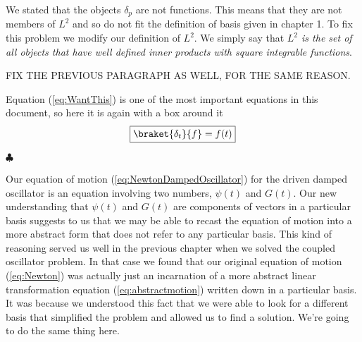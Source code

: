 We stated that the objects $\delta_{p}$ are not functions.  This means that they are not members of $L^2$ and so do not fit the definition of basis given in chapter 1.  To fix this problem we modify our definition of $L^2$.  We simply say that \emph{$L^2$ is the set of all objects that have well defined inner products with square integrable functions}.

FIX THE PREVIOUS PARAGRAPH AS WELL, FOR THE SAME REASON.

Equation (\ref{eq:WantThis}) is one of the most important equations in this document, so here it is again with a box around it
\begin{displaymath} \framebox{$\braket{\delta_t}{f}=f(t)$} \end{displaymath}

\begin{flushleft} $\clubsuit$ \end{flushleft}
Our equation of motion (\ref{eq:NewtonDampedOscillator}) for the driven damped oscillator is an equation involving two numbers, $\psi(t)$ and $G(t)$.
Our new understanding that $\psi(t)$ and $G(t)$ are components of vectors in a particular basis suggests to us that we may be able to recast the equation of motion into a more abstract form that does not refer to any particular basis.
This kind of reasoning served us well in the previous chapter when we solved the coupled oscillator problem.
In that case we found that our original equation of motion (\ref{eq:Newton}) was actually just an incarnation of a more abstract linear transformation equation (\ref{eq:abstractmotion}) written down in a particular basis.
It was because we understood this fact that we were able to look for a different basis that simplified the problem and allowed us to find a solution.
We're going to do the same thing here.

